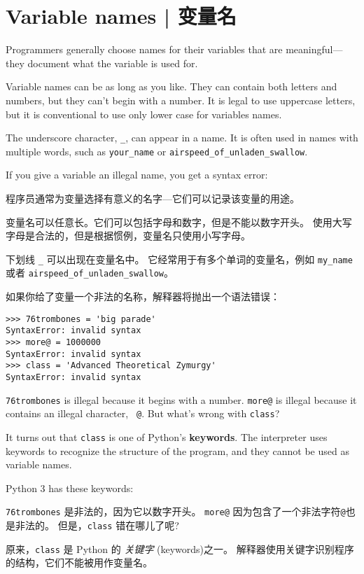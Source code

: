 \section{Variable names  |  变量名}

Programmers generally choose names for their variables that
are meaningful---they document what the variable is used for.

Variable names can be as long as you like.  They can contain
both letters and numbers, but they can't begin with a number.
It is legal to use uppercase letters, but it is conventional
to use only lower case for variables names.

The underscore character, \verb"_", can appear in a name.
It is often used in names with multiple words, such as
\verb"your_name" or \verb"airspeed_of_unladen_swallow".

If you give a variable an illegal name, you get a syntax error:

程序员通常为变量选择有意义的名字—它们可以记录该变量的用途。

变量名可以任意长。它们可以包括字母和数字，但是不能以数字开头。 使用大写字母是合法的，但是根据惯例，变量名只使用小写字母。

下划线 \lstinline{_} 可以出现在变量名中。 它经常用于有多个单词的变量名，例如 \lstinline{my_name} 或者 \lstinline{airspeed_of_unladen_swallow}。

如果你给了变量一个非法的名称，解释器将抛出一个语法错误：

\begin{lstlisting}
>>> 76trombones = 'big parade'
SyntaxError: invalid syntax
>>> more@ = 1000000
SyntaxError: invalid syntax
>>> class = 'Advanced Theoretical Zymurgy'
SyntaxError: invalid syntax
\end{lstlisting}
%
{\tt 76trombones} is illegal because it begins with a number.
{\tt more@} is illegal because it contains an illegal character, {\tt
@}.  But what's wrong with {\tt class}?

It turns out that {\tt class} is one of Python's {\bf keywords}.  The
interpreter uses keywords to recognize the structure of the program,
and they cannot be used as variable names.

Python 3 has these keywords:

\lstinline{76trombones} 是非法的，因为它以数字开头。 \lstinline{more@} 因为包含了一个非法字符\lstinline{@}也是非法的。 但是，\lstinline{class} 错在哪儿了呢?

原来，\lstinline{class} 是 Python 的 \emph{关键字} (keywords)之一。 解释器使用关键字识别程序的结构，它们不能被用作变量名。

